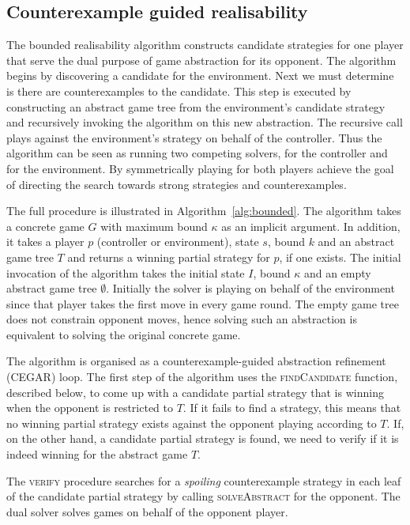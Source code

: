 \subsection{Counterexample guided realisability}

The bounded realisability algorithm constructs candidate strategies for one player that serve the dual purpose of game abstraction for its opponent. The algorithm begins by discovering a candidate for the environment. Next we must determine is there are counterexamples to the candidate. This step is executed by constructing an abstract game tree from the environment's candidate strategy and recursively invoking the algorithm on this new abstraction. The recursive call plays against the environment's strategy on behalf of the controller. Thus the algorithm can be seen as running two competing solvers, for the controller and for the environment. By symmetrically playing for both players achieve the goal of directing the search towards strong strategies and counterexamples.

The full procedure is illustrated in Algorithm~\ref{alg:bounded}.  The
algorithm takes a concrete game $G$ with maximum bound $\kappa$ as an implicit
argument.  In addition, it takes a player $p$ (controller or environment),
state $s$, bound $k$ and an abstract game tree $T$ and returns a winning
partial strategy for $p$, if one exists.  The initial invocation of the
algorithm takes the initial state $I$, bound $\kappa$ and an empty abstract
game tree $\emptyset$.  Initially the solver is playing on behalf of the
environment since that player takes the first move in every game round.  The
empty game tree does not constrain opponent moves, hence solving such an
abstraction is equivalent to solving the original concrete game.

The algorithm is organised as a counterexample-guided abstraction refinement
(CEGAR) loop.  The first step of the algorithm uses the \textsc{findCandidate}
function, described below, to come up with a candidate partial strategy that is
winning when the opponent is restricted to $T$.  If it fails to find a
strategy, this means that no winning partial strategy exists against the opponent
playing according to $T$.  If, on the other hand, a
candidate partial strategy is found, we need to verify if it is indeed winning
for the abstract game $T$.

The \textsc{verify} procedure searches for a \emph{spoiling} counterexample
strategy in each leaf of the candidate partial strategy by calling
\textsc{solveAbstract} for the opponent. The dual solver solves games on behalf
of the opponent player.  

